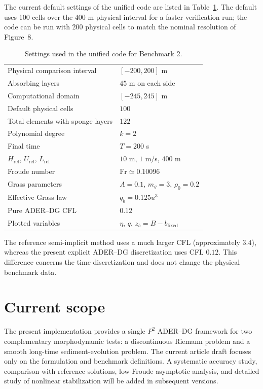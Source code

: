\documentclass[11pt]{article}
\newcommand{\Fr}{\mathrm{Fr}}
\begin{document}
The current default settings of the unified code are listed in Table~\ref{tab:benchmark2}. The default uses 100 cells over the $400$ m physical interval for a faster verification run; the code can be run with 200 physical cells to match the nominal resolution of Figure~8.

\begin{table}[h]
\centering
\caption{Settings used in the unified code for Benchmark 2.}
\label{tab:benchmark2}
\begin{tabular}{ll}
\toprule
Physical comparison interval & $[-200,200]$ m \\
Absorbing layers & $45$ m on each side \\
Computational domain & $[-245,245]$ m \\
Default physical cells & $100$ \\
Total elements with sponge layers & $122$ \\
Polynomial degree & $k=2$ \\
Final time & $T=200$ s \\
$H_{\mathrm{ref}}$, $U_{\mathrm{ref}}$, $L_{\mathrm{ref}}$ & $10$ m, $1$ m/s, $400$ m \\
Froude number & $\Fr\simeq 0.10096$ \\
Grass parameters & $A=0.1$, $m_g=3$, $\rho_0=0.2$ \\
Effective Grass law & $q_b=0.125u^3$ \\
Pure ADER--DG CFL & $0.12$ \\
Plotted variables & $\eta$, $q$, $z_b=B-b_{\mathrm{fixed}}$ \\
\bottomrule
\end{tabular}
\end{table}

The reference semi-implicit method uses a much larger CFL (approximately $3.4$), whereas the present explicit ADER--DG discretization uses CFL $0.12$. This difference concerns the time discretization and does not change the physical benchmark data.

\section{Current scope}

The present implementation provides a single $P^2$ ADER--DG framework for two complementary morphodynamic tests: a discontinuous Riemann problem and a smooth long-time sediment-evolution problem. The current article draft focuses only on the formulation and benchmark definitions. A systematic accuracy study, comparison with reference solutions, low-Froude asymptotic analysis, and detailed study of nonlinear stabilization will be added in subsequent versions.
\end{document}
